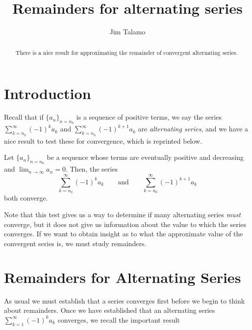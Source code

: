 \documentclass{ximera}
\title[Dig-In:]{Remainders for alternating series}
\author{Jim Talamo}
\begin{document}
\begin{abstract}
There is a nice result for approximating the remainder of convergent alternating series. 
\end{abstract}
\maketitle

\section{Introduction}
Recall that if $\{a_n\}_{n=n_0}$ is a sequence of positive terms, we say the series $\sum_{k=n_0}^{\infty} (-1)^k a_k$ and $\sum_{k=n_0}^{\infty} (-1)^{k+1} a_k$ are \emph{alternating series}, and we have a nice result to test these for convergence, which is reprinted below.

\begin{theorem}
Let $\{a_n\}_{n=n_0}$ be a sequence whose terms are eventually positive and decreasing and
$\lim_{n\to\infty}a_n=0$. Then, the series 
\[
\sum_{k=n_0}^\infty (-1)^{k}a_k \qquad \text{and}\qquad \sum_{k=n_0}^\infty (-1)^{k+1}a_k 
\]
both converge.
\end{theorem}


Note that this test gives us a way to determine if many alternating series \emph{must} converge, but it does not give us information about the value to which the series converges.  If we want to obtain insight as to what the approximate value of the convergent series is, we must study remainders.

  



\section{Remainders for Alternating Series}
As usual we must establish that a series converges first before we begin to think about remainders.  Once we have established that an alternating series $\sum_{k=1}^{\infty} (-1)^k a_k$ converges, we recall the important result

\begin{image}
  \end{image}
\end{document}
